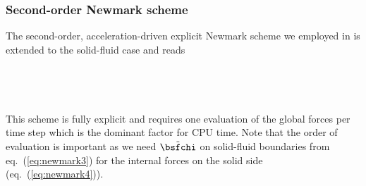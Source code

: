 \subsubsection{Second-order Newmark scheme}
%
The second-order, acceleration-driven explicit Newmark scheme we employed in
\citet{nissen+:07b} is extended to the solid-fluid case and reads
\citep{manu03}
\eqa
{}\label{eq:newmark1}\\
\label{eq:newmark2}\\
\label{eq:newmark3}\\
\label{eq:newmark4}\\
\label{eq:newmark5}\\
\label{eq:newmark6}
\ena
%
This scheme is fully explicit and requires one evaluation of the global
forces per time step which is the dominant factor for CPU time. Note that the
order of evaluation is important as we need $\ddot{\bsfchi}$ on
solid-fluid boundaries from eq.~(\ref{eq:newmark3})
for the internal forces on the solid side (eq.~(\ref{eq:newmark4})).
%
